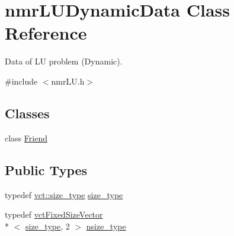 \hypertarget{classnmr_l_u_dynamic_data}{\section{nmr\-L\-U\-Dynamic\-Data Class Reference}
\label{classnmr_l_u_dynamic_data}
}


Data of L\-U problem (Dynamic).  




{\ttfamily \#include $<$nmr\-L\-U.\-h$>$}

\subsection*{Classes}
\begin{DoxyCompactItemize}
\item 
class \hyperlink{classnmr_l_u_dynamic_data_1_1_friend}{Friend}
\end{DoxyCompactItemize}
\subsection*{Public Types}
\begin{DoxyCompactItemize}
\item 
typedef \hyperlink{namespacevct_a3e2935e13aac4500965e00d30565775b}{vct\-::size\-\_\-type} \hyperlink{classnmr_l_u_dynamic_data_a63259a289f8f94498b5102ce39722bbe}{size\-\_\-type}
\item 
typedef \hyperlink{classvct_fixed_size_vector}{vct\-Fixed\-Size\-Vector}\\*
$<$ \hyperlink{classnmr_l_u_dynamic_data_a63259a289f8f94498b5102ce39722bbe}{size\-\_\-type}, 2 $>$ \hyperlink{classnmr_l_u_dynamic_data_a5b722c87d1d635328893aa3f54ac35a1}{nsize\-\_\-type}
\end{DoxyCompactItemize}
